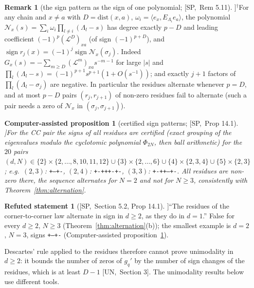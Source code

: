 \documentclass[10pt,a4paper]{article}
\theoremstyle{plain}
\newtheorem{caproposition}[theorem]{Computer-assisted proposition}
\theoremstyle{definition}
\newtheorem{refuted}[theorem]{Refuted statement}
\newtheorem{remark}[theorem]{Remark}
\newcommand{\NEW}{\ensuremath{^{\dagger}}}       %
\newcommand{\src}[2]{[\textsf{#1},~#2]}           %
\newcommand{\SPE}{\textsf{SP}}
\newcommand{\UNI}{\textsf{UN}}
\newcommand{\Lg}{\mathcal{L}}
\newcommand{\sgn}{\operatorname{sign}}
\begin{document}
\begin{remark}[the sign pattern as the sign of one polynomial; \src{\SPE}{Rem 5.11}]\NEW\label{rem:signpoly}
For any chain and $x\ne a$ with $D=\mathrm{dist}(x,a)$, $\omega_i=\langle e_x,E_{\Lambda_i}e_a\rangle$, the polynomial $\mathcal N_x(s)=\sum_i\omega_i\prod_{l\ne i}(\Lambda_l-s)$ has degree exactly $p-D$ and leading coefficient $(-1)^p(\Lg^D)_{xa}$ (of sign $(-1)^{p+D}$), and $\sgn r_j(x)=(-1)^j\sgn\mathcal N_x(\sigma_j)$. Indeed $G_x(s)=-\sum_{m\ge D}(\Lg^m)_{xa}s^{-m-1}$ for large $|s|$ and $\prod_l(\Lambda_l-s)=(-1)^{p+1}s^{p+1}(1+O(s^{-1}))$; and exactly $j+1$ factors of $\prod_l(\Lambda_l-\sigma_j)$ are negative. In particular the residues alternate whenever $p=D$, and at most $p-D$ pairs $(r_j,r_{j+1})$ of non-zero residues fail to alternate (such a pair needs a zero of $\mathcal N_x$ in $(\sigma_j,\sigma_{j+1})$).
\end{remark}

\begin{caproposition}[certified sign patterns; \src{\SPE}{Prop 14.1}]\label{prop:signpatterns}
For the CC pair the signs of all residues are certified (exact grouping of the eigenvalues modulo the cyclotomic polynomial $\Phi_{2N}$, then ball arithmetic) for the $20$ pairs $(d,N)\in\{2\}\times\{2,\dots,8,10,11,12\}\cup\{3\}\times\{2,\dots,6\}\cup\{4\}\times\{2,3,4\}\cup\{5\}\times\{2,3\}$; e.g.\ $(2,3)$: \texttt{+--+-}, $(2,4)$: \texttt{+-+++-+-}, $(3,3)$: \texttt{+-++--+-}. All residues are non-zero there, the sequence alternates for $N=2$ and not for $N\ge3$, consistently with Theorem~\ref{thm:alternation}.
\end{caproposition}

\begin{refuted}[\src{\SPE}{Section 5.2, Prop 14.1}]\label{ref:alternation}
``The residues of the corner-to-corner law alternate in sign in $d\ge2$, as they do in $d=1$.'' False for every $d\ge2$, $N\ge3$ (Theorem~\ref{thm:alternation}(b)); the smallest example is $d=2$, $N=3$, signs \texttt{+--+-} (Computer-assisted proposition~\ref{prop:signpatterns}).
\end{refuted}

Descartes' rule applied to the residues therefore cannot prove unimodality in $d\ge2$: it bounds the number of zeros of $g_q'$ by the number of sign changes of the residues, which is at least $D-1$ \src{\UNI}{Section 3}. The unimodality results below use different tools.
\end{document}
